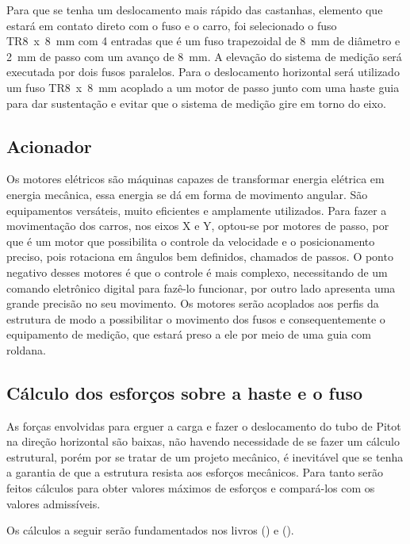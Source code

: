 Para que se tenha um deslocamento mais rápido das castanhas, elemento que estará em contato 
direto com o fuso e o carro, foi selecionado o fuso TR8~x~8~mm com 4 entradas que é um fuso trapezoidal 
de 8~mm de diâmetro e 2~mm de passo com um avanço de 8~mm. A elevação do sistema de medição será 
executada por dois fusos paralelos. Para o deslocamento horizontal será utilizado um fuso TR8~x~8~mm 
acoplado a um motor de passo junto com uma haste guia para dar sustentação e evitar que o sistema 
de medição gire em torno do eixo.

\subsection{Acionador}\label{subsec:metacionador}

Os motores elétricos são máquinas capazes de transformar energia elétrica em energia mecânica, 
essa energia se dá em forma de movimento angular. São equipamentos versáteis, muito eficientes 
e amplamente utilizados. Para fazer a movimentação dos carros, nos eixos X e Y, optou-se por 
motores de passo, por que é um motor que possibilita o controle da velocidade e o posicionamento 
preciso, pois rotaciona em ângulos bem definidos, chamados de passos. O ponto negativo desses 
motores é que o controle é mais complexo, necessitando de um comando eletrônico digital para 
fazê-lo funcionar, por outro lado apresenta uma grande precisão no seu movimento. Os motores 
serão acoplados aos perfis da estrutura de modo a possibilitar o movimento dos fusos e consequentemente 
o equipamento de medição, que estará preso a ele por meio de uma guia com roldana. 

\subsection{Cálculo dos esforços sobre a haste e o fuso}\label{subsec:metcalculos}

As forças envolvidas para erguer a carga e fazer o deslocamento do tubo de Pitot na direção horizontal 
são baixas, não havendo necessidade de se fazer um cálculo estrutural, porém por se tratar de 
um projeto mecânico, é inevitável que se tenha a garantia de que a estrutura resista aos 
esforços mecânicos. Para tanto serão feitos cálculos para obter valores máximos de esforços 
e compará-los com os valores admissíveis.

Os cálculos a seguir serão fundamentados nos livros \citeauthor{juvinall2020fundamentals} (\citeyear{juvinall2020fundamentals}) e \citeauthor{budynas2016elementos} (\citeyear{budynas2016elementos}).

